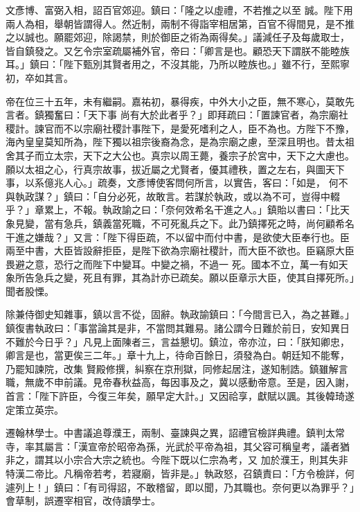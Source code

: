 \begin{pinyinscope}
 文彥博、富弼入相，詔百官郊迎。鎮曰：「隆之以虛禮，不若推之以至
 誠。陛下用兩人為相，舉朝皆謂得人。然近制，兩制不得詣宰相居第，百官不得間見，是不推之以誠也。願罷郊迎，除謁禁，則於御臣之術為兩得矣。」議減任子及每歲取士，皆自鎮發之。又乞令宗室疏屬補外官，帝曰：「卿言是也。顧恐天下謂朕不能睦族耳。」鎮曰：「陛下甄別其賢者用之，不沒其能，乃所以睦族也。」雖不行，至熙寧初，卒如其言。



 帝在位三十五年，未有繼嗣。嘉祐初，暴得疾，中外大小之臣，無不寒心，莫敢先言者。鎮獨奮曰：「天下事
 尚有大於此者乎？」即拜疏曰：「置諫官者，為宗廟社稷計。諫官而不以宗廟社稷計事陛下，是愛死嗜利之人，臣不為也。方陛下不豫，海內皇皇莫知所為，陛下獨以祖宗後裔為念，是為宗廟之慮，至深且明也。昔太祖舍其子而立太宗，天下之大公也。真宗以周王薨，養宗子於宮中，天下之大慮也。願以太祖之心，行真宗故事，拔近屬之尤賢者，優其禮秩，置之左右，與圖天下事，以系億兆人心。」疏奏，文彥博使客問何所言，以實告，客曰：「如是，
 何不與執政謀？」鎮曰：「自分必死，故敢言。若謀於執政，或以為不可，豈得中輟乎？」章累上，不報。執政諭之曰：「奈何效希名干進之人。」鎮貽以書曰：「比天象見變，當有急兵，鎮義當死職，不可死亂兵之下。此乃鎮擇死之時，尚何顧希名干進之嫌哉？」又言：「陛下得臣疏，不以留中而付中書，是欲使大臣奉行也。臣兩至中書，大臣皆設辭拒臣，是陛下欲為宗廟社稷計，而大臣不欲也。臣竊原大臣畏避之意，恐行之而陛下中變耳。中變之禍，不過一
 死。國本不立，萬一有如天象所告急兵之變，死且有罪，其為計亦已疏矣。願以臣章示大臣，使其自擇死所。」聞者股慄。



 除兼侍御史知雜事，鎮以言不從，固辭。執政諭鎮曰：「今間言已入，為之甚難。」鎮復書執政曰：「事當論其是非，不當問其難易。諸公謂今日難於前日，安知異日不難於今日乎？」凡見上面陳者三，言益懇切。鎮泣，帝亦泣，曰：「朕知卿忠，卿言是也，當更俟三二年。」章十九上，待命百餘日，須發為白。朝廷知不能奪，乃罷知諫院，改集
 賢殿修撰，糾察在京刑獄，同修起居注，遂知制誥。鎮雖解言職，無歲不申前議。見帝春秋益高，每因事及之，冀以感動帝意。至是，因入謝，首言：「陛下許臣，今復三年矣，願早定大計。」又因祫享，獻賦以諷。其後韓琦遂定策立英宗。



 遷翰林學士。中書議追尊濮王，兩制、臺諫與之異，詔禮官檢詳典禮。鎮判太常寺，率其屬言：「漢宣帝於昭帝為孫，光武於平帝為祖，其父容可稱皇考，議者猶非之，謂其以小宗合大宗之統也。今陛下既以仁宗為考，又
 加於濮王，則其失非特漢二帝比。凡稱帝若考，若寢廟，皆非是。」執政怒，召鎮責曰：「方令檢詳，何遽列上！」鎮曰：「有司得詔，不敢稽留，即以聞，乃其職也。奈何更以為罪乎？」會草制，誤遷宰相官，改侍讀學士。




\end{pinyinscope}
